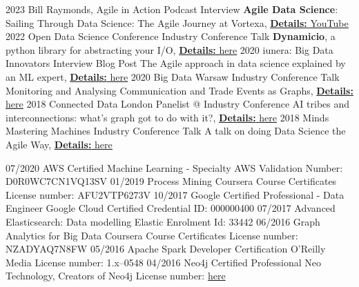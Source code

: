 \documentclass[]{../../friggeri-cv}
\begin{document}
\begin{entrylist2}
	\entrytwo
		{\small 2023}
		{\small Bill Raymonds, Agile in Action}
		{\small Podcast Interview}
		{\small \textbf{Agile Data Science}: Sailing Through Data Science: The Agile Journey at Vortexa, \underline{\textbf{Details:} \href{https://christos-hadjinikolis.github.io//2023/10/31/Agile-In-Action.html}{YouTube}}}
	\entrytwo
		{\small 2022}
		{\small Open Data Science Conference}
		{\small Industry Conference Talk}
		{\small \textbf{Dynamicio}, a python library for abstracting your I/O, \underline{\textbf{Details:} \href{https://odsc.com/speakers/dynamicio-a-pandas-i-o-wrapper-why-you-should-start-your-ml-ops-journey-with-wrapping-your-i-o/}{here}}}
	\entrytwo
		{\small 2020}
		{\small iunera: Big Data Innovators}
		{\small Interview Blog Post}
		{\small The Agile approach in data science explained by an ML expert, \underline{\textbf{Details:} \href{https://www.iunera.com/kraken/interviews/the-agile-approach-in-data-science-explained-by-an-ml-expert/}{here}}}
	\entrytwo
		{\small 2020}
		{\small Big Data Warsaw}
		{\small Industry Conference Talk}
		{\small Monitoring and Analysing Communication and Trade Events as Graphs, \underline{\textbf{Details:} \href{https://bigdatatechwarsaw.eu/agenda/}{here}}}
	\entrytwo
		{\small 2018}
		{\small Connected Data London}
		{\small Panelist @ Industry Conference}
		{\small AI tribes and interconnections: what’s graph got to do with it?, \underline{\textbf{Details:} \href{http://connected-data.london/2018/09/23/ai-tribes-and-interconnections-whats-graph-got-to-do-with-it/}{here}}}
	\entrytwo
		{\small 2018}
		{\small Minds Mastering Machines}
		{\small Industry Conference Talk}
		{\small A talk on doing Data Science the Agile Way, \underline{\textbf{Details:} \href{https://2018.mcubed.london/sessions/data-science-agile-way/}{here}}}
\end{entrylist2}
\begin{entrylist2}
	\entrytwo
		{\small 07/2020}
		{\small AWS Certified Machine Learning - Specialty}
		{\small AWS}
		{\small Validation Number: D0R0WC7CN1VQ13SV}
	\entrytwo
		{\small 01/2019}
		{\small Process Mining}
		{\small Coursera Course Certificates}
		{\small License number: AFU2VTP6273V}
	\entrytwo
		{\small 10/2017}
		{\small Google Certified Professional - Data Engineer}
		{\small Google Cloud Certified}
		{\small Credential ID: 000000400}
	\entrytwo
		{\small 07/2017}
		{\small Advanced Elasticsearch: Data modelling }
		{\small Elastic}
		{\small Enrolment Id: 33442}
	\entrytwo
		{\small 06/2016}
		{\small Graph Analytics for Big Data }
		{\small Coursera Course Certificates}
		{\small License number: NZADYAQ7N8FW}
	\entrytwo
		{\small 05/2016}
		{\small Apache Spark Developer Certification}
		{\small O'Reilly Media}
		{\small License number: 1.x–0548}
	\entrytwo
		{\small 04/2016}
		{\small Neo4j Certified Professional}
		{\small Neo Technology, Creators of Neo4j}
		{\small License number: \href{https://drive.google.com/open?id=1ol67OnuuWBmrIeJPbvLNOOiQC8K0pXb_}{here}}
\end{entrylist2}
\end{document}
